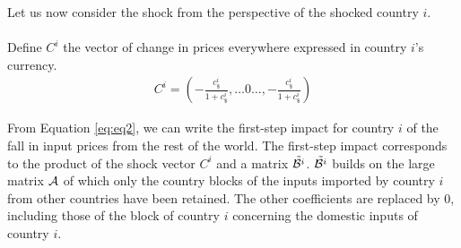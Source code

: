 \documentclass[11pt,a4paper]{article}
\begin{document}
Let us now consider the shock from the perspective of the shocked country $i$.\\
\\%
%
%
%
Define $C^i$ the vector of change in prices everywhere expressed in country $i$'s currency.\\
\begin{eqnarray*}
C^i = \left(-\frac{c_\$^i}{1+c_\$^i},\ldots0\ldots,-\frac{c_\$^i}{1+c_\$^i} \right)
\end{eqnarray*}

From Equation \ref{eq:eq2}, we can write the first-step impact for country $i$ of the fall in input prices from the rest of the world. 
The first-step impact corresponds to the product of the shock vector $C^i$ and a matrix ${\tilde{{\cal B}^i}}$. ${\tilde{{\cal B}^i}}$ builds on the large matrix ${\cal A}$ of which only the country blocks of the inputs imported by country $i$ from other countries have been retained. 
The other coefficients are replaced by 0, including those of the block of country $i$ concerning the domestic inputs of country $i$. \\
\end{document}
